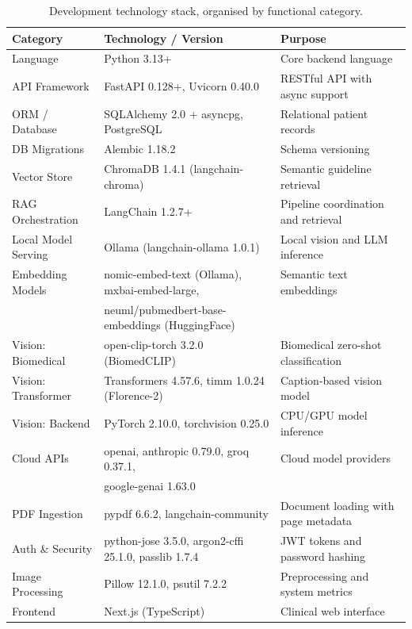 \documentclass[12pt,a4paper]{report}
\begin{document}
\begin{table}[H]
\centering
\caption{Development technology stack, organised by functional category.}
\label{tab:stack}
\small
\renewcommand{\arraystretch}{1.25}
\begin{tabularx}{\textwidth}{@{}l l X@{}}
\toprule
\textbf{Category} & \textbf{Technology / Version} & \textbf{Purpose} \\
\midrule
Language             & Python 3.13+                                         & Core backend language \\
API Framework        & FastAPI 0.128+, Uvicorn 0.40.0                       & RESTful API with async support \\
ORM / Database       & SQLAlchemy 2.0 + asyncpg, PostgreSQL                 & Relational patient records \\
DB Migrations        & Alembic 1.18.2                                       & Schema versioning \\
Vector Store         & ChromaDB 1.4.1 (langchain-chroma)                    & Semantic guideline retrieval \\
RAG Orchestration    & LangChain 1.2.7+                                     & Pipeline coordination and retrieval \\
Local Model Serving  & Ollama (langchain-ollama 1.0.1)                      & Local vision and LLM inference \\
Embedding Models     & nomic-embed-text (Ollama), mxbai-embed-large,        & Semantic text embeddings \\
                     & neuml/pubmedbert-base-embeddings (HuggingFace)       & \\
Vision: Biomedical   & open-clip-torch 3.2.0 (BiomedCLIP)                  & Biomedical zero-shot classification \\
Vision: Transformer  & Transformers 4.57.6, timm 1.0.24 (Florence-2)       & Caption-based vision model \\
Vision: Backend      & PyTorch 2.10.0, torchvision 0.25.0                   & CPU/GPU model inference \\
Cloud APIs           & openai, anthropic 0.79.0, groq 0.37.1,               & Cloud model providers \\
                     & google-genai 1.63.0                                  & \\
PDF Ingestion        & pypdf 6.6.2, langchain-community                     & Document loading with page metadata \\
Auth \& Security     & python-jose 3.5.0, argon2-cffi 25.1.0, passlib 1.7.4 & JWT tokens and password hashing \\
Image Processing     & Pillow 12.1.0, psutil 7.2.2                          & Preprocessing and system metrics \\
Frontend             & Next.js (TypeScript)                                 & Clinical web interface \\
\bottomrule
\end{tabularx}
\end{table}
\end{document}

